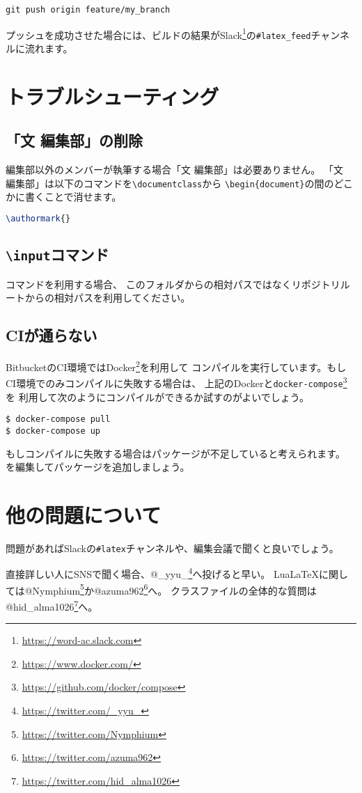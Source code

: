 \documentclass[../../main]{subfiles}
\begin{document}
\begin{lstlisting}[mathescape]
git push origin feature/my_branch
\end{lstlisting}

プッシュを成功させた場合には、ビルドの結果がSlack\footnote{\url{https://word-ac.slack.com}}の\texttt{\#latex\_feed}チャンネルに流れます。

\section{トラブルシューティング}

\subsection{「文 編集部」の削除}

編集部以外のメンバーが執筆する場合「文 編集部」は必要ありません。
「文　編集部」は以下のコマンドを\lstinline|\documentclass|から
\lstinline|\begin{document}|の間のどこかに書くことで消せます。

\begin{lstlisting}[language=TeX, mathescape]
\authormark{}    
\end{lstlisting}

\subsection{\texttt{\textbackslash input}コマンド}

\lstinline||コマンドを利用する場合、
このフォルダからの相対パスではなくリポジトリルートからの相対パスを利用してください。

\subsection{CIが通らない}

BitbucketのCI環境ではDocker\footnote{\url{https://www.docker.com/}}を利用して
コンパイルを実行しています。もしCI環境でのみコンパイルに失敗する場合は、
上記のDockerと\lstinline|docker-compose|\footnote{\url{https://github.com/docker/compose}}を
利用して次のようにコンパイルができるか試すのがよいでしょう。

\begin{lstlisting}
$ docker-compose pull
$ docker-compose up
\end{lstlisting}

もしコンパイルに失敗する場合はパッケージが不足していると考えられます。
を編集してパッケージを追加しましょう。

\section{他の問題について}

問題があればSlackの\texttt{\#latex}チャンネルや、編集会議で聞くと良いでしょう。

直接詳しい人にSNSで聞く場合、@\_yyu\_\footnote{\url{https://twitter.com/_yyu_}}へ投げると早い。
Lua\LaTeX に関しては@Nymphium\footnote{\url{https://twitter.com/Nymphium}}か@azuma962\footnote{\url{https://twitter.com/azuma962}}へ。
クラスファイルの全体的な質問は@hid\_alma1026\footnote{\url{https://twitter.com/hid_alma1026}}へ。
\end{document}
